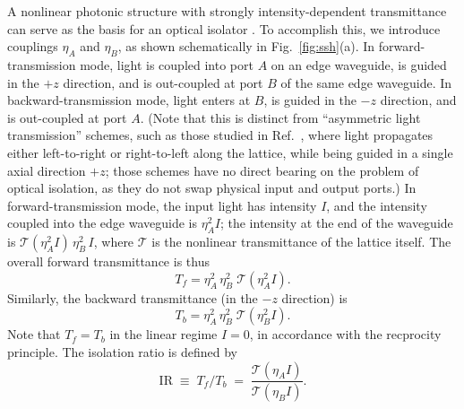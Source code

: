 \documentclass[aps,prx,twocolumn,superscriptaddress]{revtex4-1}
\begin{document}
A nonlinear photonic structure with strongly intensity-dependent transmittance can serve as the basis for an optical isolator \cite{philip2007apl, anand2013nl, peng2014nature, chang2014nature, zhou2016oe, jiang2016chip}.  To accomplish this, we introduce couplings $\eta_A$ and $\eta_B$, as shown schematically in Fig.~\ref{fig:ssh}(a).  In forward-transmission mode, light is coupled into port $A$ on an edge waveguide, is guided in the $+z$ direction, and is out-coupled at port $B$ of the same edge waveguide.  In backward-transmission mode, light enters at $B$, is guided in the $-z$ direction, and is out-coupled at port $A$.  (Note that this is distinct from ``asymmetric light transmission'' schemes, such as those studied in Ref.~, where light propagates either left-to-right or right-to-left along the lattice, while being guided in a single axial direction $+z$; those schemes have no direct bearing on the problem of optical isolation, as they do not swap physical input and output ports.)  In forward-transmission mode, the input light has intensity $I$, and the intensity coupled into the edge waveguide is $\eta_A^2 I$; the intensity at the end of the waveguide is $\mathcal{T}(\eta_A^2 I) \, \eta_B^2 \, I$, where $\mathcal{T}$ is the nonlinear transmittance of the lattice itself.  The overall forward transmittance is thus
\begin{equation}
  T_f = \eta_A^2 \, \eta_B^2 \; \mathcal{T}(\eta_A^2 I).
  \label{eq:Tf}
\end{equation}
Similarly, the backward transmittance (in the $-z$ direction) is
\begin{equation}
  T_b = \eta_A^2 \, \eta_B^2 \; \mathcal{T}(\eta_B^2 I).
  \label{eq:Tb}
\end{equation}
Note that $T_f = T_b$ in the linear regime $I = 0$, in accordance with the recprocity principle.  The isolation ratio is defined by
\begin{equation}
  \mathrm{IR} \;\equiv\; T_f/T_b\; =\;
  \frac{\mathcal{T}(\eta_AI)}{\mathcal{T}(\eta_BI)}.
\end{equation}
\end{document}

